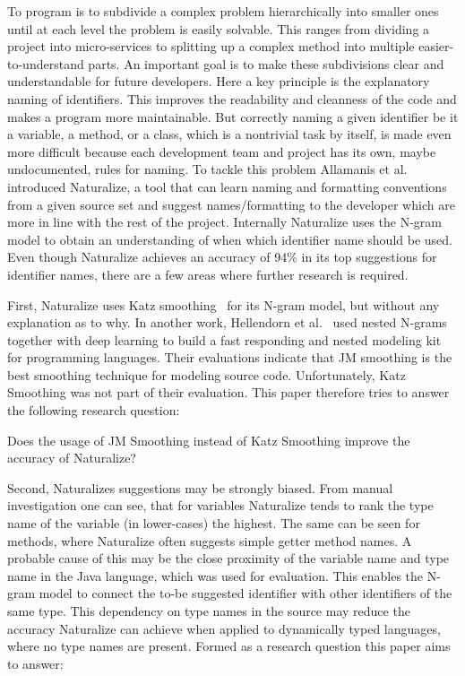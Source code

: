To program is to subdivide a complex problem hierarchically into smaller ones until at each level the problem is easily solvable. This ranges from dividing a project into micro-services to splitting up a complex method into multiple easier-to-understand parts.
An important goal is to make these subdivisions clear and understandable for future developers. Here a key principle is the explanatory naming of identifiers. This improves the readability and cleanness of the code and makes a program more maintainable. But correctly naming a given identifier be it a variable, a method, or a class, which is a nontrivial task by itself, is made even more difficult because each development team and project has its own, maybe undocumented, rules for naming. To tackle this problem Allamanis et al.~\cite{naturalize} introduced Naturalize, a tool that can learn naming and formatting conventions from a given source set and suggest names/formatting to the developer which are more in line with the rest of the project. Internally Naturalize uses the N-gram model to obtain an understanding of when which identifier name should be used. Even though Naturalize achieves an accuracy of 94\% in its top suggestions for identifier names, there are a few areas where further research is required.

First, Naturalize uses Katz smoothing~\cite{naturalize} for its N-gram model, but without any explanation as to why. In another work, Hellendorn et al.~\cite{nestedngram} used nested N-grams together with deep learning to build a fast responding and nested modeling kit for programming languages. Their evaluations indicate that JM smoothing is the best smoothing technique for modeling source code. Unfortunately, Katz Smoothing was not part of their evaluation. This paper therefore tries to answer the following research question:

\begin{resquest} \label{hyp:jmsmoothing}
Does the usage of JM Smoothing instead of Katz Smoothing improve the accuracy of Naturalize?
\end{resquest}

Second, Naturalizes suggestions may be strongly biased. From manual investigation one can see, that for variables Naturalize tends to rank the type name of the variable (in lower-cases) the highest. The same can be seen for methods, where Naturalize often suggests simple getter method names. A probable cause of this may be the close proximity of the variable name and type name in the Java language, which was used for evaluation. This enables the N-gram model to connect the to-be suggested identifier with other identifiers of the same type. This dependency on type names in the source may reduce the accuracy Naturalize can achieve when applied to dynamically typed languages, where no type names are present. Formed as a research question this paper aims to answer:

